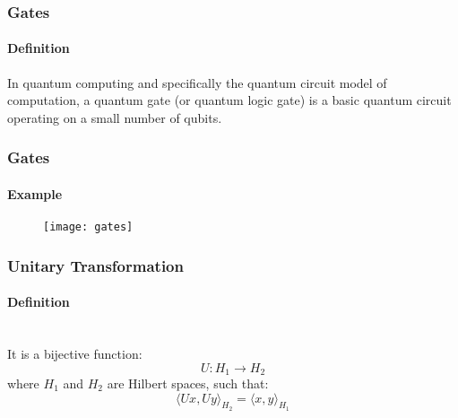 \begin{frame}
	\frametitle{Gates}
		\framesubtitle{Definition}
		\vspace{-1cm}
	{\normalsize
    \begin{block}{}	
{In quantum computing and specifically the quantum circuit model of computation, a quantum gate (or quantum logic gate) is a basic quantum circuit operating on a small number of qubits.}\\
	\end{block}
	}
\end{frame}

\begin{frame}
	\frametitle{Gates}
		\framesubtitle{Example}
	\vspace{0.5cm}
		\begin{figure}
		\centering
			\texttt{[image: gates]}
			\label{fig:gates gates}
		\end{figure}

\end{frame}


\begin{frame}
	\frametitle{Unitary Transformation}
		\framesubtitle{Definition}
		\vspace{-1cm}
	{\normalsize
	\hspace{0.5cm}{Unitary transformation is transformation  that preserves the inner product (isometry).}\\
	\vspace{0.5cm}
	 It is a bijective function:
	$$ U:H_1 \to H_2 $$
where $H_1$ and $H_2$ are Hilbert spaces, such that:\\
$$\langle Ux,Uy\rangle_{H_{2}}=\langle x,y\rangle _{H_{1}}$$
	}
\end{frame}

